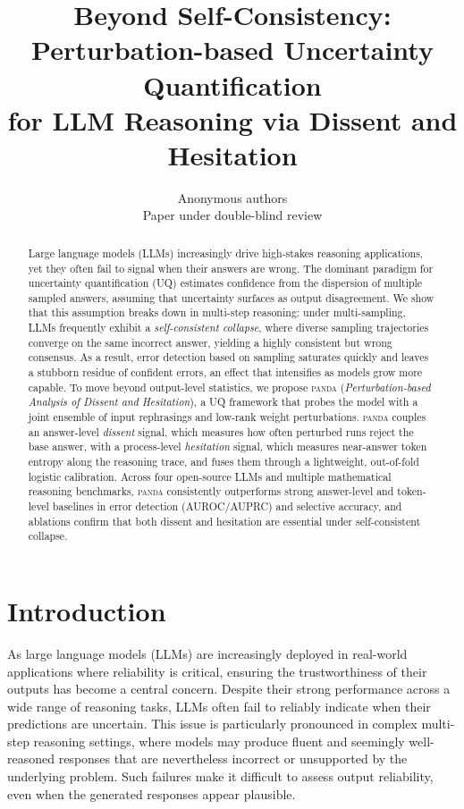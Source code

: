 \documentclass{article} %
\title{Beyond Self-Consistency: Perturbation-based Uncertainty Quantification\\ for LLM Reasoning via Dissent and Hesitation}
\author{Anonymous authors\\
Paper under double-blind review}
\DeclareRobustCommand{\method}{%
  \texorpdfstring{%
    \ifmmode\text{\normalfont\textsc{panda}}\else\textsc{panda}\xspace\fi
  }{PANDA}%
}
\newcommand{\MethodFull}{\emph{Perturbation-based Analysis of Dissent and Hesitation}\xspace}
\newcommand{\Dissent}{\emph{dissent}\xspace}
\newcommand{\Hesitation}{\emph{hesitation}\xspace}
\begin{document}
\maketitle

\begin{abstract}
Large language models (LLMs) increasingly drive high-stakes reasoning applications, yet they often fail to signal when their answers are wrong. The dominant paradigm for uncertainty quantification (UQ) estimates confidence from the dispersion of multiple sampled answers, assuming that uncertainty surfaces as output disagreement. We show that this assumption breaks down in multi-step reasoning: under multi-sampling, LLMs frequently exhibit a \emph{self-consistent collapse}, where diverse sampling trajectories converge on the same incorrect answer, yielding a highly consistent but wrong consensus. As a result, error detection based on sampling saturates quickly and leaves a stubborn residue of confident errors, an effect that intensifies as models grow more capable. To move beyond output-level statistics, we propose \method{} (\MethodFull), a UQ framework that probes the model with a joint ensemble of input rephrasings and low-rank weight perturbations. \method{} couples an answer-level \Dissent{} signal, which measures how often perturbed runs reject the base answer, with a process-level \Hesitation{} signal, which measures near-answer token entropy along the reasoning trace, and fuses them through a lightweight, out-of-fold logistic calibration. Across four open-source LLMs and multiple mathematical reasoning benchmarks, \method{} consistently outperforms strong answer-level and token-level baselines in error detection (AUROC/AUPRC) and selective accuracy, and ablations confirm that both dissent and hesitation are essential under self-consistent collapse.
\end{abstract}

\section{Introduction}
\label{sec:intro}
As large language models (LLMs) are increasingly deployed in real-world applications where reliability is critical, ensuring the trustworthiness of their outputs has become a central concern. Despite their strong performance across a wide range of reasoning tasks, LLMs often fail to reliably indicate when their predictions are uncertain. This issue is particularly pronounced in complex multi-step reasoning settings, where models may produce fluent and seemingly well-reasoned responses that are nevertheless incorrect or unsupported by the underlying problem. Such failures make it difficult to assess output reliability, even when the generated responses appear plausible.
\end{document}
